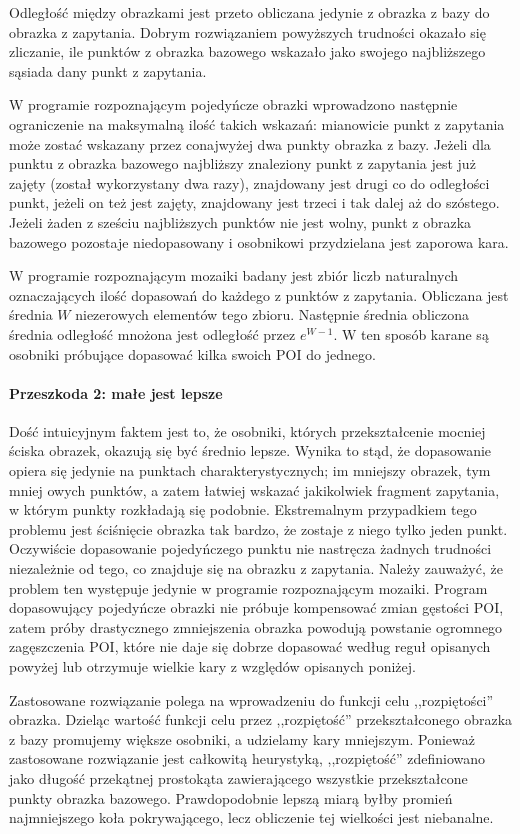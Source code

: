 \documentclass[a4paper,12pt,leqno]{article}
\begin{document}
Odległość między obrazkami jest przeto obliczana jedynie z obrazka z bazy do obrazka z zapytania. Dobrym rozwiązaniem powyższych trudności okazało się zliczanie,
ile punktów z obrazka bazowego wskazało jako swojego najbliższego sąsiada dany punkt z zapytania.

W programie rozpoznającym pojedyńcze obrazki wprowadzono następnie ograniczenie na maksymalną ilość takich wskazań: mianowicie punkt z zapytania może zostać
wskazany przez conajwyżej dwa punkty obrazka z bazy. Jeżeli dla punktu z obrazka bazowego najbliższy znaleziony punkt z zapytania jest już zajęty (został
wykorzystany dwa razy), znajdowany jest drugi co do odległości punkt, jeżeli on też jest zajęty, znajdowany jest trzeci i tak dalej aż do szóstego. Jeżeli
żaden z sześciu najbliższych punktów nie jest wolny, punkt z obrazka bazowego pozostaje niedopasowany i osobnikowi przydzielana jest zaporowa kara.

W programie rozpoznającym mozaiki badany jest zbiór liczb naturalnych oznaczających ilość dopasowań do każdego z punktów z zapytania. Obliczana jest średnia
$W$ niezerowych elementów tego zbioru. Następnie średnia obliczona średnia odległość mnożona jest odległość przez $e^{W-1}$. W ten sposób karane są
osobniki próbujące dopasować kilka swoich POI do jednego.

\paragraph{Przeszkoda 2: małe jest lepsze}
Dość intuicyjnym faktem jest to, że osobniki, których przekształcenie mocniej ściska obrazek, okazują się być średnio lepsze. Wynika to stąd, że dopasowanie opiera
się jedynie na punktach charakterystycznych; im mniejszy obrazek, tym mniej owych punktów, a zatem łatwiej wskazać jakikolwiek fragment zapytania, w którym punkty
rozkładają się podobnie. Ekstremalnym przypadkiem tego problemu jest ściśnięcie obrazka tak bardzo, że zostaje z niego tylko jeden punkt. Oczywiście dopasowanie
pojedyńczego punktu nie nastręcza żadnych trudności niezależnie od tego, co znajduje się na obrazku z zapytania. Należy zauważyć, że problem ten występuje jedynie
w programie rozpoznającym mozaiki. Program dopasowujący pojedyńcze obrazki nie próbuje kompensować zmian gęstości POI, zatem próby drastycznego zmniejszenia obrazka
powodują powstanie ogromnego zagęszczenia POI, które nie daje się dobrze dopasować według reguł opisanych powyżej lub otrzymuje wielkie kary z względów opisanych poniżej.

Zastosowane rozwiązanie polega na wprowadzeniu do funkcji celu ,,rozpiętości'' obrazka. Dzieląc wartość funkcji celu przez ,,rozpiętość'' przekształconego obrazka z 
bazy promujemy większe osobniki, a udzielamy kary mniejszym. Ponieważ zastosowane rozwiązanie jest całkowitą heurystyką, ,,rozpiętość'' zdefiniowano jako długość
przekątnej prostokąta zawierającego wszystkie przekształcone punkty obrazka bazowego. Prawdopodobnie lepszą miarą byłby promień najmniejszego koła pokrywającego,
lecz obliczenie tej wielkości jest niebanalne.
\end{document}
